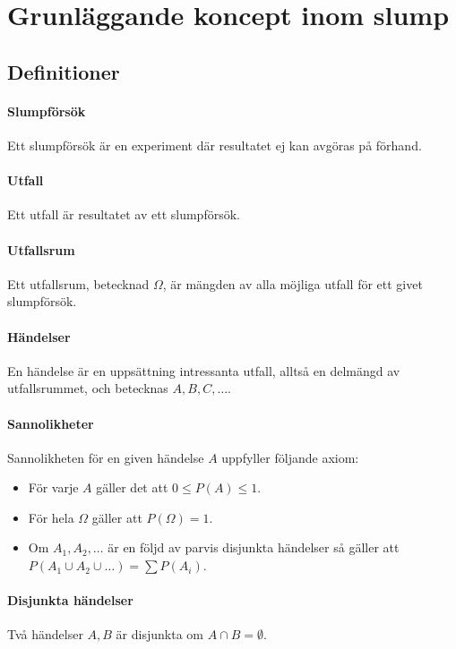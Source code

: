 \section{Grunläggande koncept inom slump}

\subsection{Definitioner}

\paragraph{Slumpförsök}
Ett slumpförsök är en experiment där resultatet ej kan avgöras på förhand.

\paragraph{Utfall}
Ett utfall är resultatet av ett slumpförsök.

\paragraph{Utfallsrum}
Ett utfallsrum, betecknad $\Omega$, är mängden av alla möjliga utfall för ett givet slumpförsök.

\paragraph{Händelser}
En händelse är en uppsättning intressanta utfall, alltså en delmängd av utfallsrummet, och betecknas $A, B, C, \dots$.

\paragraph{Sannolikheter}
Sannolikheten för en given händelse $A$ uppfyller följande axiom:
\begin{itemize}
	\item För varje $A$ gäller det att $0\leq P(A)\leq 1$.
	\item För hela $\Omega$ gäller att $P(\Omega) = 1$.
	\item Om $A_1, A_2, \dots$ är en följd av parvis disjunkta händelser så gäller att $P(A_1\cup A_2\cup\dots) = \sum P(A_i)$.
\end{itemize}

\paragraph{Disjunkta händelser}
Två händelser $A, B$ är disjunkta om $A\cap B = \emptyset$.

